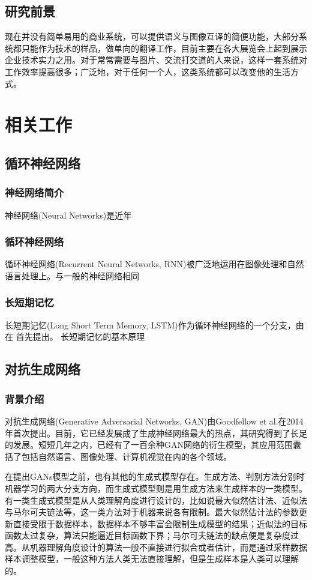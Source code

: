 \subsection{研究前景}
现在并没有简单易用的商业系统，可以提供语义与图像互译的简便功能，大部分系统都只能作为技术的样品，做单向的翻译工作，目前主要在各大展览会上起到展示企业技术实力之用。对于常常需要与图片、交流打交道的人来说，这样一套系统对工作效率提高很多；广泛地，对于任何一个人，这类系统都可以改变他的生活方式。

\section{相关工作}

\subsection{循环神经网络}
\subsubsection{神经网络简介}
神经网络(Neural Networks)是近年

\subsubsection{循环神经网络}
循环神经网络(Recurrent Neural Networks, RNN)被广泛地运用在图像处理和自然语言处理上。与一般的神经网络相同

\subsubsection{长短期记忆}
长短期记忆(Long Short Term Memory, LSTM)作为循环神经网络的一个分支，由 在 首先提出。 长短期记忆的基本原理

\subsection{对抗生成网络}
\subsubsection{背景介绍}
对抗生成网络(Generative Adversarial Networks, GAN)由Goodfellow et al.在2014年首次提出。目前，它已经发展成了生成神经网络最大的热点，其研究得到了长足的发展。短短几年之内，已经有了一百余种GAN网络的衍生模型，其应用范围囊括了包括自然语言、图像处理、计算机视觉在内的各个领域。

在提出GANs模型之前，也有其他的生成式模型存在。生成方法、判别方法分别时机器学习的两大分支方向，而生成式模型则是用生成方法来生成样本的一类模型。有一类生成式模型是从人类理解角度进行设计的，比如说最大似然估计法、近似法与马尔可夫链法等，这一类方法对于机器来说各有限制。最大似然估计法的参数更新直接受限于数据样本，数据样本不够丰富会限制生成模型的结果；近似法的目标函数太过复杂，算法只能逼近目标函数下界；马尔可夫链法的缺点便是复杂度过高。从机器理解角度设计的算法一般不直接进行拟合或者估计，而是通过采样数据样本调整模型，一般这种方法人类无法直接理解，但是生成样本是人类可以理解的。

